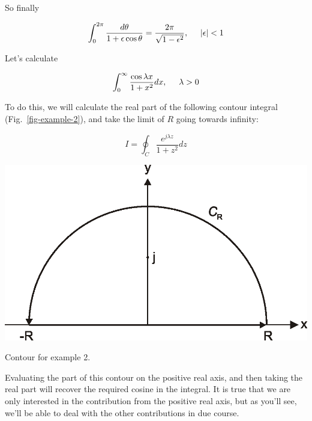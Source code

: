 So finally

\begin{equation}
\int_0^{2 \pi} \frac{d \theta}{1 + \epsilon \cos \theta} = \frac{2 \pi}{\sqrt{1
- \epsilon^2}}, \hspace{0.5cm} |\epsilon| < 1
\end{equation} 
 

\pagebreak


Let's calculate

\begin{equation}
\int_0^{\infty}\frac{\cos \lambda x}{1 + x^2} dx, \hspace{0.5cm} \lambda > 0
\end{equation}

\noindent{}To do this, we will calculate the real part of the following contour integral (Fig.~\ref{fig-example-2}), and take the limit of $R$ going towards infinity:

\begin{equation}
I = \oint_{{C}} \frac{e^{j \lambda z}}{1 + z^2} dz
\end{equation}

\begin{marginfigure}
\centering
\includegraphics{complex/figures/int_ex_2}
\caption{Contour for example 2.}
\label{fig-example-2}
\end{marginfigure}

Evaluating the part of this contour on the positive real axis, and then taking the real part will recover the required cosine in the integral. It is true that we are only interested in the contribution from the positive real axis, but as you'll see, we'll be able to deal with the other contributions in due course.

